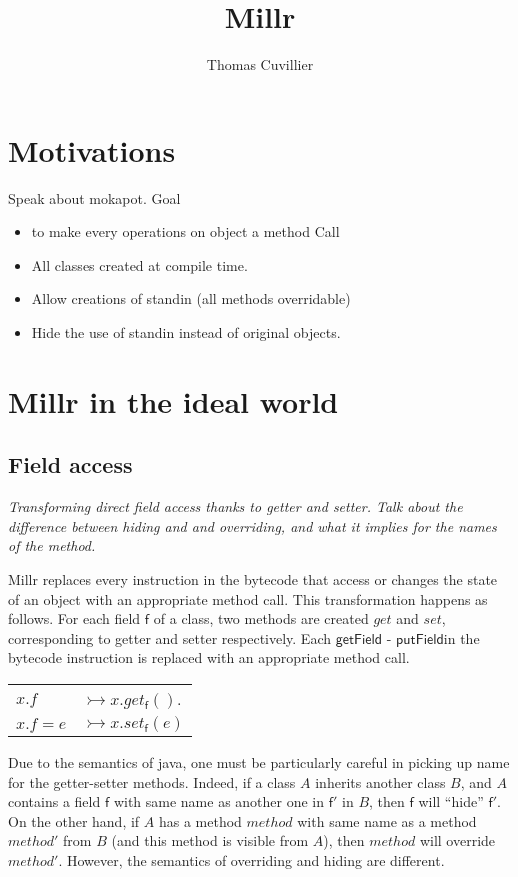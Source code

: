 \documentclass[a4paper, 11pt, english]{article}
\author{Thomas Cuvillier}
\title{Millr}
\newcommand{\field}{\mathsf{f}}
\newcommand{\getter}{get}
\newcommand{\setter}{set}
\newcommand{\getField}{\mathsf{getField}}
\newcommand{\setField}{\mathsf{putField}}
\newcommand{\method}{method}
\newcommand{\methodBis}{method'}
\begin{document}
\maketitle

\section{Motivations}

Speak about mokapot. Goal 
\begin{itemize}
\item to make every operations on object a method Call 
\item All classes created at compile time.
\item Allow creations of standin (all methods overridable)
\item Hide the use of standin instead of original objects.
\end{itemize}

\section{Millr in the ideal world}
  
\subsection{Field access}

\textit{
Transforming direct field access thanks to getter and setter.
Talk about the difference between hiding and and overriding, and what it implies for the names of the method.}


Millr replaces every instruction in the bytecode that access or changes the state of an object with an appropriate method call. This transformation happens as follows. For each field $\field$ of a class, two methods are created $\getter$ and $\setter$, corresponding to getter and setter respectively. Each $\getField$ - $\setField$in the bytecode instruction is replaced with an appropriate method call.
\begin{tabular}{ll}
$x.f$ & $\rightarrowtail x.\getter_\field()$. \\
$x. f = e$ & $ \rightarrowtail x.\setter_\field( e)$
\end{tabular}


Due to the semantics of java, one must be particularly careful in picking up name for the getter-setter methods. Indeed, if a class $A$ inherits another class $B$, and $A$ contains a field $\field$ with same name as another one in $\field'$ in $B$, then $\field$ will \enquote{hide} $\field'$. On the other hand, if $A$ has a method $\method$ with same name as a method $\methodBis$ from $B$ (and this method is visible from $A$), then $\method$ will override $\methodBis$. However, the semantics of overriding and hiding are different.
\end{document}
